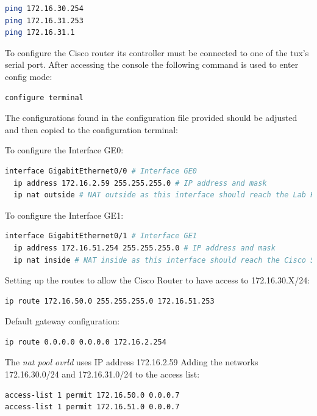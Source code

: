 \documentclass[a4paper,11pt,english]{article}
\begin{document}
\begin{lstlisting}[language=sh]
ping 172.16.30.254
ping 172.16.31.253
ping 172.16.31.1
\end{lstlisting}


            To configure the Cisco router its controller must be connected to one of the
            tux's serial port. After accessing the console the following command is used to
            enter config mode:

\begin{lstlisting}[language=sh]
configure terminal
\end{lstlisting}

            The configurations found in the configuration file provided
            should be adjusted and then copied to the configuration terminal:

            To configure the Interface GE0:

\begin{lstlisting}[language=sh]
interface GigabitEthernet0/0 # Interface GE0
  ip address 172.16.2.59 255.255.255.0 # IP address and mask
  ip nat outside # NAT outside as this interface should reach the Lab Router
\end{lstlisting}

            To configure the Interface GE1:
\begin{lstlisting}[language=sh]
interface GigabitEthernet0/1 # Interface GE1
  ip address 172.16.51.254 255.255.255.0 # IP address and mask
  ip nat inside # NAT inside as this interface should reach the Cisco Switch
\end{lstlisting}


            Setting up the routes to allow the Cisco Router to have access to 172.16.30.X/24:

\begin{lstlisting}[language=sh]
ip route 172.16.50.0 255.255.255.0 172.16.51.253
\end{lstlisting}

            Default gateway configuration:

\begin{lstlisting}[language=sh]
ip route 0.0.0.0 0.0.0.0 172.16.2.254
\end{lstlisting}

            The \textit{nat pool ovrld} uses IP address 172.16.2.59
            Adding the networks 172.16.30.0/24 and 172.16.31.0/24 to the access list:

\begin{lstlisting}[language=sh]
access-list 1 permit 172.16.50.0 0.0.0.7
access-list 1 permit 172.16.51.0 0.0.0.7
\end{lstlisting}
\end{document}
